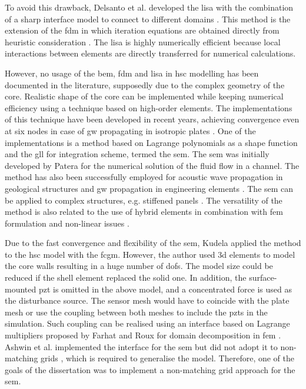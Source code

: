 To avoid this drawback, Delsanto et al. developed the \ac{lisa} with the combination of a sharp interface model to connect to different domains \cite{delsantoO1992connection}. This method is the extension of the \ac{fdm} in which iteration equations are obtained directly from heuristic consideration \cite{willberg2015simulation}.
The \ac{lisa} is highly numerically efficient because local interactions between elements are directly transferred for numerical calculations.

However, no usage of the \ac{bem}, \ac{fdm} and \ac{lisa} in \ac{hsc} modelling has been documented in the literature, supposedly due to the complex geometry of the core.
Realistic shape of the core can be implemented while keeping numerical efficiency using a technique based on high-order elements.
The implementations of this technique have been developed in recent years, achieving convergence even at six nodes in case of \ac{gw} propagating in isotropic plates \cite{willberg2012comparison}.
One of the implementations is a method based on Lagrange polynomials as a shape function and the \ac{gll} for integration scheme, termed the \ac{sem}.
The \ac{sem} was initially developed by Patera \cite{patera1984spectral} for the numerical solution of the fluid flow in a channel.
The method has also been successfully employed for acoustic wave propagation in geological structures \cite{seriani1994spectral, komatitsch2000simulation} and \ac{gw} propagation in engineering elements \cite{kudela2007wave, ostachowicz2011guided, rucka2010experimental,rekatsinas2017cubic}.
The \ac{sem} can be applied to complex structures, e.g. stiffened panels \cite{schulte2011simulation, lonkar2014modeling}.
The versatility of the method is also related to the use of hybrid elements in combination with \ac{fem} formulation \cite{ha2009optimizing} and non-linear issues \cite{yu2020time, li2021hybrid}.

Due to the fast convergence and flexibility of the \ac{sem}, Kudela \cite{kudela2016parallel} applied the method to the \ac{hsc} model with the \ac{fcgm}.
However, the author used \ac{3d} elements to model the core walls resulting in a huge number of \acp{dof}.
The model size could be reduced if the shell element replaced the solid one.
In addition, the surface-mounted \ac{pzt} is omitted in the above model, and a concentrated force is used as the disturbance source.
The sensor mesh would have to coincide with the plate mesh or use the coupling between both meshes to include the \acp{pzt} in the simulation.
Such coupling can be realised using an interface based on Lagrange multipliers proposed by Farhat and Roux for domain decomposition in \ac{fem} \cite{farhat1991method}.
Ashwin et al. implemented the interface for the \ac{sem} but did not adopt it to non-matching grids \cite{ashwin2014formulation}, which is required to generalise the model.
Therefore, one of the goals of the dissertation was to implement a non-matching grid approach for the \ac{sem}.

